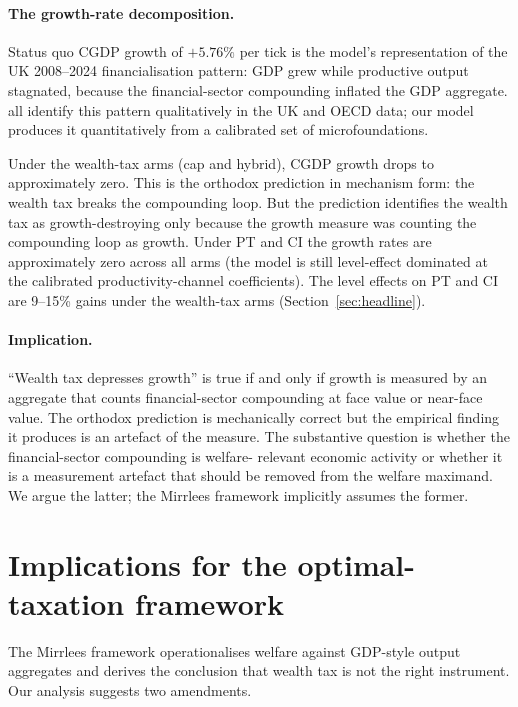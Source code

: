 \documentclass[11pt]{article}
\begin{document}
\paragraph{The growth-rate decomposition.}  Status quo CGDP growth of
$+5.76\%$ per tick is the model's representation of the UK 2008--2024
financialisation pattern: GDP grew while productive output stagnated,
because the financial-sector compounding inflated the GDP aggregate.
\citet{coyle2014gdp, mazzucato2018value, pilling2018growth} all
identify this pattern qualitatively in the UK and OECD data; our
model produces it quantitatively from a calibrated set of
microfoundations.

Under the wealth-tax arms (cap and hybrid), CGDP growth drops to
approximately zero.  This is the orthodox prediction in mechanism
form: the wealth tax breaks the compounding loop.  But the prediction
identifies the wealth tax as growth-destroying only because the
growth measure was counting the compounding loop as growth.  Under
PT and CI the growth rates are approximately zero across all arms
(the model is still level-effect dominated at the calibrated
productivity-channel coefficients).  The level effects on PT and CI
are 9--15\% gains under the wealth-tax arms
(Section~\ref{sec:headline}).

\paragraph{Implication.}  ``Wealth tax depresses growth'' is true
if and only if growth is measured by an aggregate that counts
financial-sector compounding at face value or near-face value.  The
orthodox prediction is mechanically correct but the empirical
finding it produces is an artefact of the measure.  The substantive
question is whether the financial-sector compounding is welfare-
relevant economic activity or whether it is a measurement artefact
that should be removed from the welfare maximand.  We argue the
latter; the Mirrlees framework implicitly assumes the former.

\section{Implications for the optimal-taxation framework}
\label{sec:implications}

The Mirrlees framework operationalises welfare against GDP-style
output aggregates and derives the conclusion that wealth tax is not
the right instrument.  Our analysis suggests two amendments.
\end{document}
